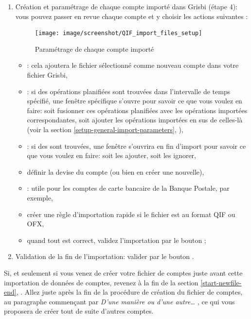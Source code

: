 \begin{enumerate}
	\item Création et paramétrage de chaque compte importé dans Grisbi (étape 4): vous pouvez passer en revue chaque compte et y choisir les actions suivantes	:
	\begin{figure}[htbp]
		\begin{center}
		\texttt{[image: image/screenshot/QIF\_import\_files\_setup]}
		\end{center}
		\caption{Paramétrage de chaque compte importé}
		\label{QIF-import-files-setup-img}
	\end{figure}
		\begin{itemize}
			\item {}: cela ajoutera le fichier sélectionné comme nouveau compte dans votre fichier Grisbi,
			\item {}: si des opérations planifiées sont trouvées dans l'intervalle de temps spécifié, une fenêtre spécifique s'ouvre pour savoir ce que vous voulez en faire: soit fusionner ces opérations planifiées avec les opérations importées correspondantes, soit ajouter les opérations importées en sus de celles-là (voir la section \vref{setup-general-import-parameters}, ),
			\item {}: si des  sont trouvées, une fenêtre s'ouvrira en fin d'import pour savoir ce que vous voulez en faire: soit les ajouter, soit les ignorer,
			\item définir la devise du compte (ou bien en créer une nouvelle),
			\item {}: utile pour les comptes de carte bancaire de la Banque Postale, par exemple,
			\item créer une règle d'importation rapide si le fichier est au format \gls{QIF} ou \gls{OFX},%
			\item quand tout est correct, validez l'importation par le bouton ;
		\end{itemize}
	\item Validation de la fin de l'importation: valider par le bouton .
\end{enumerate}

Si, et seulement si vous venez de créer votre fichier de comptes juste avant cette importation de données de comptes, revenez à la fin de la section \vref{start-newfile-end}, . Allez juste après la fin de la procédure de création du fichier de comptes, au paragraphe commençant par \emph{D'une manière ou d'une autre\ldots{ }}, ce qui vous proposera de créer tout de suite d'autres comptes.

